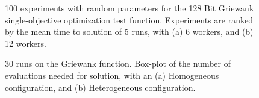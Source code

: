 \documentclass{llncs}
\begin{document}
\begin{figure}[t]
    \centering

    \caption{100 experiments with random parameters for the 128 Bit Griewank 
    single-objective optimization test function. Experiments are ranked by 
    the mean time to solution of 5 runs, with (a) 6 workers, and (b) 12 workers.}
    \label{fig:griewank}
\end{figure}


\begin{figure}[t]
    \centering
      \caption{ 30 runs on the Griewank function. Box-plot of the number of evaluations needed for solution, 
                 with an (a) Homogeneous configuration, and (b) Heterogeneous configuration.}
    \label{fig:griewank-evals}
\end{figure}
\end{document}

